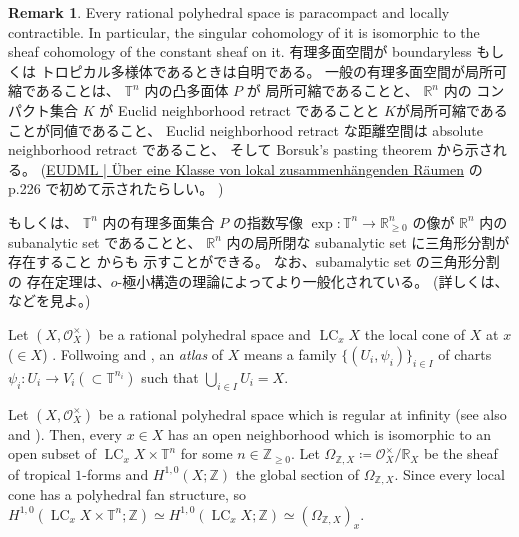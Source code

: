 \documentclass[a4paper,dvipdfmx,reqno,12pt]{amsart}
\theoremstyle{definition}
\newtheorem{remark}[theorem]{Remark}
\newcommand{\deq}{\coloneqq}
\newcommand{\opn}[1]{\operatorname{#1}}
\numberwithin{equation}{section}
\begin{document}
\begin{remark}
Every rational polyhedral space
is paracompact and locally contractible.
In particular, the singular cohomology of it 
is isomorphic to the sheaf cohomology of
the constant sheaf on it.
有理多面空間が
boundaryless もしくは
トロピカル多様体であるときは自明である。
一般の有理多面空間が局所可縮であることは、
$\mathbb{T}^{n}$ 内の凸多面体 $P$ が
局所可縮であることと、
$\mathbb{R}^{n}$ 内の コンパクト集合 $K$ が Euclid 
neighborhood retract であることと
$K$が局所可縮であることが同値であること、
Euclid neighborhood retract な距離空間は
absolute neighborhood retract であること、
そして Borsuk's pasting theorem から示される。
(\href{https://eudml.org/doc/212574}{EUDML | Über eine Klasse von lokal zusammenhängenden Räumen}
の p.226 で初めて示されたらしい。
)

もしくは、
$\mathbb{T}^{n}$ 内の有理多面集合 $P$ の指数写像
$\opn{exp}\colon \mathbb{T}^{n}\to 
\mathbb{R}^{n}_{\geq 0}$ の像が $\mathbb{R}^{n}$
内の subanalytic set であることと、
$\mathbb{R}^{n}$ 内の局所閉な
subanalytic set に三角形分割が存在すること
\cite{MR760983} からも
示すことができる。
なお、subamalytic set の三角形分割の
存在定理は、$o$-極小構造の理論によってより一般化されている。
(詳しくは、\cite[Theorem II]{MR1463945} などを見よ。)
\end{remark}
Let $(X,\mathcal{O}_X^{\times})$ be a rational polyhedral space
and $\opn{LC}_x X$ the local cone of $X$ at $x$ ($\in X$)
\cite[]{MR4637248}.
Follwoing \cite[Definition 7.1.8]{mikhalkin2018tropical} and 
\cite[Definition 2.3]{demedrano2023chern},
an \emph{atlas} of $X$ means a family 
$\{(U_i,\psi_i)\}_{i\in I}$ of charts 
$\psi_i\colon U_i\to V_i (\subset \mathbb{T}^{n_i})$
\cite[Definition 2.2]{MR4637248}
such that $\bigcup_{i\in I}U_i=X$.

Let $(X,\mathcal{O}_X^{\times})$ be
a rational polyhedral space which is regular at
infinity \cite[]{MR4637248}
(see also \cite[Definition 1.2]{MR3330789}
and \cite[Definition 7.2.4]{mikhalkin2018tropical}).
Then, every $x\in X$ has an open neighborhood
which is isomorphic to an open subset of 
$\opn{LC}_x X\times \mathbb{T}^n$ for some
$n\in \mathbb{Z}_{\geq 0}$.
Let $\Omega_{\mathbb{Z},X}\deq
\mathcal{O}_X^{\times}/\mathbb{R}_X$ be
the sheaf of tropical $1$-forms and
$H^{1,0}(X;\mathbb{Z})$ the global section of 
$\Omega_{\mathbb{Z},X}$.
Since every local cone has a polyhedral fan structure,
so $H^{1,0}(\opn{LC}_x X\times \mathbb{T}^n;\mathbb{Z})
\simeq H^{1,0}(\opn{LC}_x X;\mathbb{Z})\simeq 
(\Omega_{\mathbb{Z},X})_x$.
\end{document}
